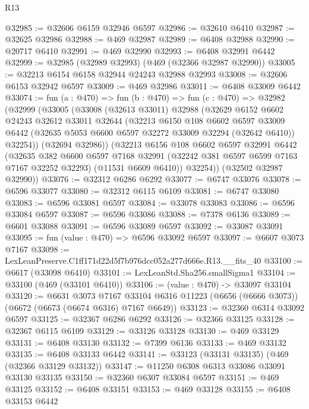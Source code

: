 \begin{lexlean}{R13}
\begin{coremodule}
@32985 := @32606 @6159 @32946 @6597
@32986 := @32610 @6410
@32987 := @32625 @32986
@32988 := @469 @32987
@32989 := @6408 @32988
@32990 := @20717 @6410
@32991 := @469 @32990
@32993 := @6408 @32991 @6442
@32999 := @32985 (@32989 @32993) (@469 (@32366 @32987 @32990))
@33005 := @32213 @6154 @6158 @32944 @24243 @32988 @32993
@33008 := @32606 @6153 @32942 @6597
@33009 := @469 @32986
@33011 := @6408 @33009 @6442
@33074 := fun (a : @470) =>
  fun (b : @470) =>
  fun (c : @470) =>
  @32982
    (@32999
      (@33005
        (@33008
          (@32613 @33011)
          @32988
          (@32629
            @6152
            @6602
            @24243
            @32612
            @33011
            @32644
            (@32213
              @6150
              @108
              @6602
              @6597
              @33009
              @6442
              (@32635 @5053 @6600 @6597 @32272 @33009 @32294 (@32642 @6410))
              @32254))
          (@32694 @32986))
        (@32213
          @6156
          @108
          @6602
          @6597
          @32991
          @6442
          (@32635
            @382
            @6600
            @6597
            @7168
            @32991
            (@32242 @381 @6597 @6599 @7163 @7167 @32252 @32293)
            (@11531 @6609 @6410))
          @32254))
      (@32502 @32987 @32990))
@33076 := @32312 @6286 @6292
@33077 := @6747 @33076
@33078 := @6596 @33077
@33080 := @32312 @6115 @6109
@33081 := @6747 @33080
@33083 := @6596 @33081 @6597
@33084 := @33078 @33083
@33086 := @6596 @33084 @6597
@33087 := @6596 @33086
@33088 := @7378 @6136
@33089 := @6601 @33088
@33091 := @6596 @33089 @6597
@33092 := @33087 @33091
@33095 := fun (value : @470) => @6596 @33092 @6597
@33097 := @6607 @3073 @7167
@33098 := LexLeanPreserve.C1ff171d22d5f7b976dcc052a277d666e.R13.__fits_40
@33100 := @6617 (@33098 @6410)
@33101 := LexLeanStd.Sha256.smallSigma1
@33104 := @33100 (@469 (@33101 @6410))
@33106 := (value : @470) -> @33097 @33104
@33120 := @6631
    @3073
    @7167
    @33104
    @6316
    @11223
    (@6656 (@6666 @3073))
    (@6672 (@6673 (@6674 @6316) @7167 @6649))
@33123 := @32360 @6314 @33092 @6597
@33125 := @32367 @6286 @6292
@33126 := @32366 @33125
@33128 := @32367 @6115 @6109
@33129 := @33126 @33128
@33130 := @469 @33129
@33131 := @6408 @33130
@33132 := @7399 @6136
@33133 := @469 @33132
@33135 := @6408 @33133 @6442
@33141 := @33123 (@33131 @33135) (@469 (@32366 @33129 @33132))
@33147 := @11250 @6308 @6313 @33086 @33091 @33130 @33135
@33150 := @32360 @6307 @33084 @6597
@33151 := @469 @33125
@33152 := @6408 @33151
@33153 := @469 @33128
@33155 := @6408 @33153 @6442

\end{coremodule}
\end{lexlean}
